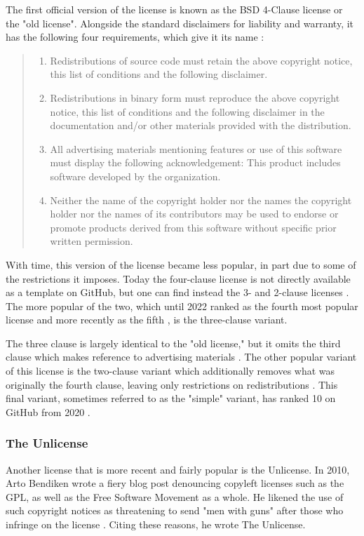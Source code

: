\documentclass[manuscript,screen,nonacm,12pt]{acmart}
\begin{document}
The first official version of the license is known as the BSD 4-Clause license
or the "old license". Alongside the standard disclaimers for liability and
warranty, it has the following four requirements, which give it its name
\cite{BSD4Clause}:

\begin{quote}
    \begin{enumerate}
        \item Redistributions of source code must retain the above copyright
        notice, this list of conditions and the following disclaimer.
        \item Redistributions in binary form must reproduce the above copyright
        notice, this list of conditions and the following disclaimer in the
        documentation and/or other materials provided with the distribution.
        \item All advertising materials mentioning features or use of this
        software must display the following acknowledgement: This product
        includes software developed by the organization.
        \item Neither the name of the copyright holder nor the names the
        copyright holder nor the names of its contributors may be used to
        endorse or promote products derived from this software without specific
        prior written permission.
    \end{enumerate}
\end{quote}

With time, this version of the license became less popular, in part due to some
of the restrictions it imposes. Today the four-clause license is not directly
available as a template on GitHub, but one can find instead the 3- and 2-clause
licenses \cite{githubUsage}. The more popular of the two, which until 2022
ranked as the fourth most popular license and more recently as the fifth
\cite{githubUsage}, is the three-clause variant.

The three clause is largely identical to the "old license," but it omits the
third clause which makes reference to advertising materials \cite{BSD3Clause}.
The other popular variant of this license is the two-clause variant which
additionally removes what was originally the fourth clause, leaving only
restrictions on redistributions \cite{BSD2Clause}. This final variant, sometimes
referred to as the "simple" variant, has ranked 10 on GitHub from
2020 \cite{githubUsage}.

\subsubsection{The Unlicense}
Another license that is more recent and fairly popular is the Unlicense. In
2010, Arto Bendiken wrote a fiery blog post denouncing copyleft licenses such as
the GPL, as well as the Free Software Movement as a whole. He likened the use of
such copyright notices as threatening to send "men with guns" after those who
infringe on the license \cite{bendiken_2025}. Citing these reasons, he wrote
The Unlicense.
\end{document}
